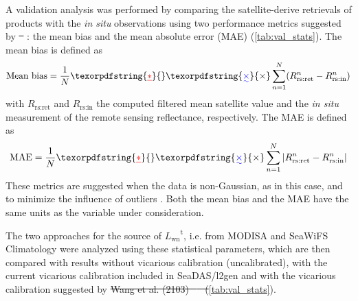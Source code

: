 \documentclass[]{interact}
\theoremstyle{plain}%
\theoremstyle{definition}
\theoremstyle{remark}
\providecommand{\DIFaddtex}[1]{{\protect\color{blue}\uwave{#1}}} %
\providecommand{\DIFdeltex}[1]{{\protect\color{red}\sout{#1}}}                      %
\providecommand{\DIFaddbegin}{} %
\providecommand{\DIFaddend}{} %
\providecommand{\DIFdelbegin}{} %
\providecommand{\DIFdelend}{} %
\providecommand{\DIFadd}[1]{\texorpdfstring{\DIFaddtex{#1}}{#1}} %
\providecommand{\DIFdel}[1]{\texorpdfstring{\DIFdeltex{#1}}{}} %
\newcommand{\DIFscaledelfig}{0.5}
\newlength{\DIFdelgraphicswidth} %
\newlength{\DIFdelgraphicsheight} %
\newcommand{\DIFaddincludegraphics}[2][]{{\color{blue}\fbox{\DIFOincludegraphics[#1]{#2}}}} %
\newcommand{\DIFdelincludegraphics}[2][]{%
\sbox{\DIFdelgraphicsbox}{\DIFOincludegraphics[#1]{#2}}%
\settoboxwidth{\DIFdelgraphicswidth}{\DIFdelgraphicsbox} %
\settoboxtotalheight{\DIFdelgraphicsheight}{\DIFdelgraphicsbox} %
\scalebox{\DIFscaledelfig}{%
\parbox[b]{\DIFdelgraphicswidth}{\usebox{\DIFdelgraphicsbox}\\[-\baselineskip] \rule{\DIFdelgraphicswidth}{0em}}\llap{\resizebox{\DIFdelgraphicswidth}{\DIFdelgraphicsheight}{%
\setlength{\unitlength}{\DIFdelgraphicswidth}%
\begin{picture}(1,1)%
\thicklines\linethickness{2pt} %
{\color[rgb]{1,0,0}\put(0,0){\framebox(1,1){}}}%
{\color[rgb]{1,0,0}\put(0,0){\line( 1,1){1}}}%
{\color[rgb]{1,0,0}\put(0,1){\line(1,-1){1}}}%
\end{picture}%
}\hspace*{3pt}}} %
} %
\DeclareRobustCommand{\DIFaddbegin}{\DIFOaddbegin \let\includegraphics\DIFaddincludegraphics} %
\DeclareRobustCommand{\DIFaddend}{\DIFOaddend \let\includegraphics\DIFOincludegraphics} %
\DeclareRobustCommand{\DIFdelbegin}{\DIFOdelbegin \let\includegraphics\DIFdelincludegraphics} %
\DeclareRobustCommand{\DIFdelend}{\DIFOaddend \let\includegraphics\DIFOincludegraphics} %
\begin{document}
A validation analysis was performed by comparing the satellite-derive retrievals of products with the {\it in situ} observations using two performance metrics suggested by \DIFdelbegin \DIFdel{\mbox{%
\citep{Seegers:18}}%
}\DIFdelend \DIFaddbegin \DIFadd{\mbox{%
\cite{Seegers:18}}%
}\DIFaddend : the mean bias and the mean absolute error (MAE) (\autoref{tab:val_stats}). The mean bias is defined as 
\begin{equation}
    \text{Mean bias} = \frac{1}{N}\DIFdelbegin \DIFdel{*}\DIFdelend \DIFaddbegin \DIFadd{\times}\DIFaddend \sum_{n=1}^N(R_\text{rs:ret}^n-R_\text{rs:in}^n)
\end{equation}
with $R_\text{rs:ret}$ and $R_\text{rs:in}$ the computed filtered mean satellite value and the {\it in situ} measurement of the remote sensing reflectance, respectively. The MAE is defined as 
\begin{equation}
    \text{MAE} = \frac{1}{N}\DIFdelbegin \DIFdel{*}\DIFdelend \DIFaddbegin \DIFadd{\times}\DIFaddend \sum_{n=1}^N\left|R_\text{rs:ret}^n-R_\text{rs:in}^n\right|
\end{equation}
These metrics are suggested when the data is non-Gaussian, as in this case, and to minimize the influence of outliers \citep{Seegers:18}. Both the mean bias and the MAE have the same units as the variable under consideration. 

The two approaches for the source of ${L_\text{wn}}^\text{t}$, i.e. from MODISA and SeaWiFS Climatology were analyzed using these statistical parameters, which are then compared with results without vicarious calibration (uncalibrated), with the current vicarious calibration included in SeaDAS/l2gen and with the vicarious calibration suggested by \DIFdelbegin \DIFdel{Wang et al. (2103) \mbox{%
\citep{Wang:13} }%
(}\DIFdelend \DIFaddbegin \DIFadd{\mbox{%
\cite{Wang:13} }%
(}\DIFaddend \autoref{tab:val_stats}).
\end{document}
